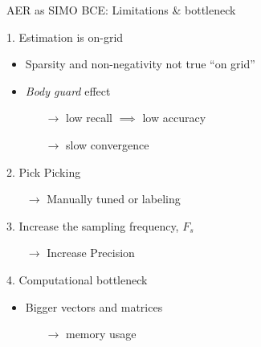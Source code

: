 \begin{frame}{AER as SIMO BCE: Limitations \& bottleneck}

    \begin{block}{1. Estimation is on-grid}
        \begin{itemize}
            \item Sparsity and non-negativity not true ``on grid''
            \pause[1]

            \item \emph{Body guard} effect \cite{duval2017sparse}
            \begin{itemize}
                \item[$\rightarrow$] low recall $\implies$ low accuracy %
                \item[$\rightarrow$] slow convergence %
            \end{itemize}
        \end{itemize}
        \pause[2]
    \end{block}

    \begin{block}{2. Pick Picking}
        \begin{itemize}
            \item[$\rightarrow$] Manually tuned or labeling
        \end{itemize}
    \end{block}
    \pause[3]

    \vfill

    \begin{block}{3. Increase the sampling frequency, $F_s$}
        \begin{itemize}
            \item[$\rightarrow$] Increase Precision
        \end{itemize}
    \end{block}
    \pause[4]

    \begin{block}{4. Computational bottleneck}
    \begin{itemize}

        \item Bigger vectors and matrices
        \begin{itemize}
            \item[$\longrightarrow$] memory usage
        \end{itemize}
        \pause[5]


\end{itemize}
\end{block}
\end{frame}
